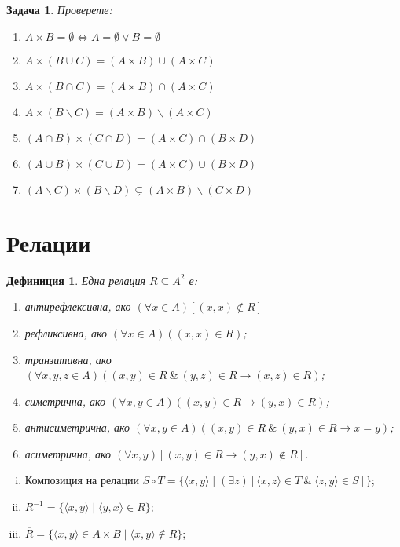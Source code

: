 \documentclass[a4paper]{article}
\newtheorem{dfn}{Дефиниция}
\newtheorem{problem}{Задача}
\begin{document}
\begin{problem}
  Проверете:
  \begin{enumerate}
  \item
    $A\times B = \emptyset \iff A = \emptyset \vee B = \emptyset$
  \item
    $A\times(B\cup C) = (A\times B)\cup(A\times C)$
  \item
    $A\times(B\cap C) = (A\times B)\cap(A\times C)$ 
  \item
    $A\times(B\backslash C) = (A\times B)\backslash(A\times C)$
  \item
    $(A\cap B)\times (C\cap D) = (A\times C)\cap(B\times D)$
  \item
    $(A\cup B)\times (C\cup D) = (A\times C)\cup(B\times D)$
  \item
    $(A\backslash C)\times(B\backslash D)\subsetneq (A\times B)\backslash(C\times D)$
  \end{enumerate}
\end{problem}




\section{Релации}


\begin{dfn}
  Една релация $R \subseteq A^2$ е:
  \begin{enumerate}[1)]
  \item
    антирефлексивна, ако
    $(\forall x\in A)[(x,x)\not\in R]$
  \item
    рефликсивна, ако
    $(\forall x\in A)((x,x)\in R)$;
  \item
    транзитивна, ако
    $(\forall x,y,z\in A)((x,y)\in R\ \&\ (y,z)\in R \rightarrow (x,z)\in R)$;
  \item
    симетрична, ако
    $(\forall x,y\in A)((x,y)\in R \rightarrow (y,x)\in R)$;
  \item
    антисиметрична, ако
    $(\forall x,y\in A)((x,y)\in R\ \&\ (y,x)\in R \rightarrow x = y)$;
  \item
    асиметрична, ако
    $(\forall x,y)[(x,y)\in R \rightarrow (y,x)\not\in R]$.
\end{enumerate}
\end{dfn}

\begin{enumerate}[(i)]
\item
  Композиция на релации
  $S\circ T = \{\langle{x,y}\rangle \mid (\exists z)[\langle{x,z}\rangle\in T\ \&\ \langle{z,y}\rangle \in S]\}$;
\item
  $R^{-1} = \{\langle{x,y}\rangle \mid \langle{y,x}\rangle \in R\}$;
\item
  $\overline{R} = \{\langle{x,y}\rangle \in A\times B \mid\langle{x,y}\rangle\not\in R\}$;
\end{enumerate}
\end{document}
